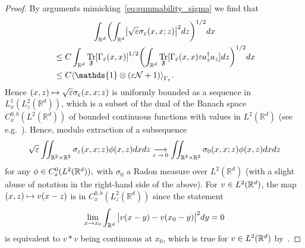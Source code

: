 \documentclass[AHL,Unicode,longabstracts,published]{cedram}
\DeclareMathOperator{\Tr}{Tr}
\newcommand{\R}{\mathbb{R}}
\newcommand{\cN}{\mathcal{N}}
\newcommand{\gF}{\mathfrak{F}}
\newcommand{\1}{\mathds{1}}
\newcommand{\eps}{\varepsilon}
\let\oldin\in
\renewcommand{\in}{\mathchoice{\oldin}{\oldin}{\,\oldin\,}{\,\oldin\,}}
\renewcommand*{\to}{\mathchoice{\longrightarrow}{\rightarrow}{\rightarrow}{\rightarrow}}
\let\oldmapsto\mapsto
\renewcommand*{\mapsto}{\mathchoice{\longmapsto}{\oldmapsto}{\oldmapsto}{\oldmapsto}}
\let\originalleft\left
\let\originalright\right
\renewcommand{\left}{\mathopen{}\mathclose\bgroup\originalleft}
\renewcommand{\right}{\aftergroup\egroup\originalright}
\begin{document}
\begin{proof}
By arguments mimicking~\eqref{eq:summability_sigma} we find that
\begin{multline*}
\int_{\R^d} \left(\int_{\R^d} \left|\sqrt{\eps}\sigma_{\eps} (x,x;z)\right|^2 dz \right) ^{1/2}dx\\
\begin{aligned}
&\leq C \int_{\R^d} \Tr_\gF \left[\Gamma_\eps (x,x)\right] ^{1 / 2} \left(\int_{\R^d} \Tr_\gF [\Gamma_\eps (x,x) \eps a^\dagger_z a_z] dz \right)^{1/2} dx \\
&\leq C\left\langle \1 \otimes \left(\eps \cN +1 \right)\right\rangle_{\Gamma_\eps}.
\end{aligned}
\end{multline*}
Hence $(x,z)\mapsto \sqrt{\eps} \sigma_{\eps} (x,x;z)$ is uniformly bounded as a sequence in $L^1_x (L^2_z (\R^d))$, which is a subset of the dual of the Banach space $C_x^{0,b} (L^2 (\R^d))$ of bounded continuous functions with values in $L^2 (\R^d)$ (see e.g.~\cite{HytNeeVerWei-16}). Hence, modulo extraction of a subsequence
\begin{equation*}
\sqrt{\eps}\iint_{\R^2 \times \R^2} \sigma_{\eps} (x,x;z) \phi(x,z) dx dz \underset{\eps\,\to\,0}{\to} \iint_{\R^2 \times \R^2} \sigma_{0} (x,x;z) \phi(x,z) dx dz
\end{equation*}
for any $\phi\in C_x^0 (L^2 (\R^d)),$ with $\sigma_0$ a Radon measure over $L^2 (\R^d)$ (with a slight abuse of notation in the right-hand side of the above). For $v\in L^2 (\R^d)$, the map $(x,z) \mapsto v(x-z)$ is in $C_x^{0,b} (L^2_z (\R^d))$ since the statement
\begin{equation*}
\lim_{x\to x_0} \int_{\R^d} \big| v(x-y)-v(x_0-y)\big|^2 dy=0
\end{equation*}
is equivalent to $v\ast v$ being continuous at $x_0$, which is true for $v\in L^2 (\R^d)$ by~\cite[Proposition~8.8]{Folland-99}.


\end{proof}
\end{document}
